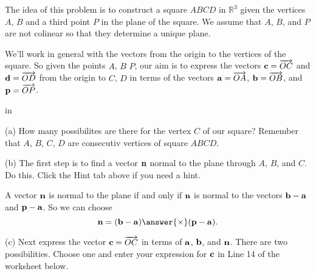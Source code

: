 \documentclass{ximera}
\newcommand{\pskip}{\vskip 0.1 in}
\begin{document}
\begin{question}  \label{Q354624ggtg}
The idea of this problem is to construct a square $ABCD$ in $\mathbb{R}^3$ given the vertices $A$, $B$ and a third point $P$ in the plane of the square. We assume that $A$, $B$, and $P$ are not colinear so that they determine a unique plane.


We'll work in general with the vectors from the origin to the vertices of the square. So given the points $A$, $B$ $P$, our aim is to express the vectors ${\bf c} = \overrightarrow{OC}$ and ${\bf d} =\overrightarrow{OD}$ from the origin to $C$, $D$ in terms of the vectors ${\bf a} = \overrightarrow{OA}$, ${\bf b} = \overrightarrow{OB}$, and ${\bf p} = \overrightarrow{OP}$. 


\pskip

(a) How many possibilites are there for the vertex $C$ of our square? Remember that $A$, $B$, $C$, $D$ are consecutiv vertices of square $ABCD$.
\begin{multipleChoice}
\end{multipleChoice}

(b) The first step is to find a vector ${\bf n}$ normal to the plane through $A$, $B$, and $C$. Do this. Click the Hint tab above if you need a hint.
\begin{hint}
A vector ${\bf n}$ is normal to the plane if and only if ${\bf n}$ is normal to the vectors ${\bf b}-{\bf a}$ and ${\bf p}-{\bf a}$. So we can choose
\[
   {\bf n} = ( {\bf b}-{\bf a}  ) \answer{\times} ({\bf p}-{\bf a})  .
\] 
\end{hint}

(c) Next express the vector ${\bf c} = \overrightarrow{OC}$ in terms of ${\bf a}$, ${\bf b}$, and ${\bf n}$. There are two possibilities. Choose one and enter your expression for ${\bf c}$ in Line 14 of the worksheet below. 

\begin{onlineOnly}
    \begin{center}
\end{center}
\end{onlineOnly}


\end{question}
\end{document}
